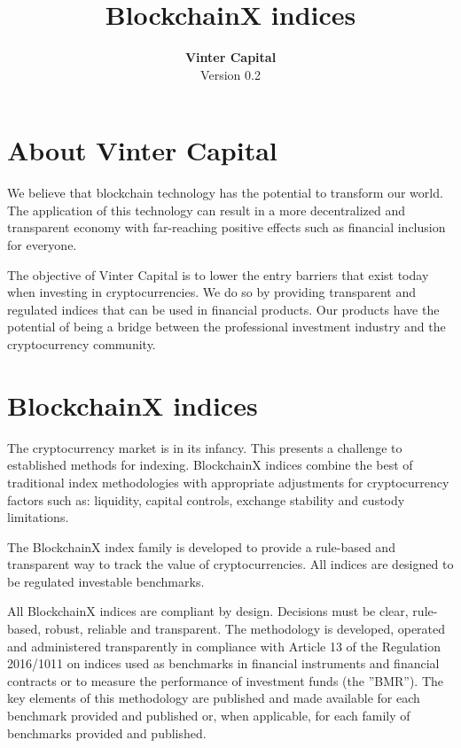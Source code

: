 \documentclass{article}
\title{\textbf{BlockchainX indices}}
\author{\textbf{Vinter Capital} \\ Version 0.2}
\begin{document}
\maketitle

\pagebreak

\tableofcontents


\section{About Vinter Capital}

We believe that blockchain technology has the potential to transform our world. The application of this technology can result in a more decentralized and transparent economy with far-reaching positive effects such as financial inclusion for everyone.

The objective of Vinter Capital is to 
lower the entry barriers that exist today when investing in cryptocurrencies. 
We do so by providing transparent and regulated indices that can be used in financial products.
Our products have the potential of being a bridge between the professional investment industry and the cryptocurrency community.


\section{BlockchainX indices}

The cryptocurrency market is in its infancy. This presents a challenge to established methods for indexing. BlockchainX indices combine the best of traditional index methodologies with appropriate adjustments for cryptocurrency factors such as: liquidity, capital controls, exchange stability and custody limitations. 

The BlockchainX index family is developed to provide a rule-based and transparent way to track the value of cryptocurrencies. All indices are designed to be regulated investable benchmarks.

All BlockchainX indices are compliant by design. 
Decisions must be clear, rule-based, robust, reliable and transparent.
  The methodology is developed, operated and administered transparently in compliance with Article 13 of the Regulation 2016/1011 on indices used as benchmarks in financial instruments and financial contracts or to measure the performance of investment funds (the ”BMR”). The key elements of this methodology are published and made available for each benchmark provided and published or, when applicable, for each family of benchmarks provided and published.
\end{document}
